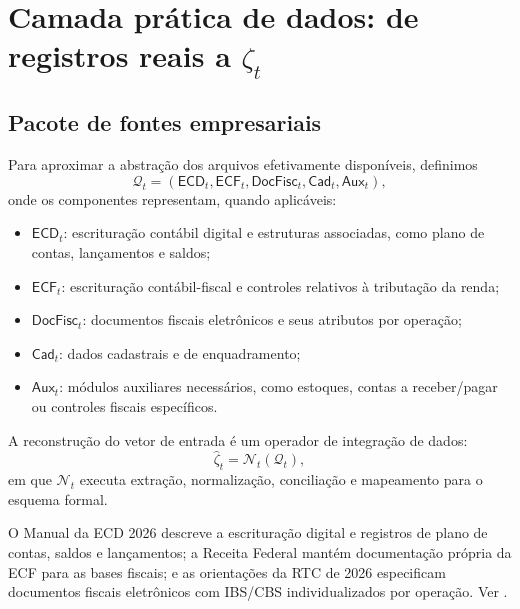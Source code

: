 \documentclass[11pt,a4paper]{article}
\newcommand{\cQ}{\mathcal{Q}}
\newcommand{\cN}{\mathcal{N}}
\begin{document}
\section{Camada prática de dados: de registros reais a $\zeta_t$}

\subsection{Pacote de fontes empresariais}

Para aproximar a abstração dos arquivos efetivamente disponíveis, definimos
\begin{equation}
\boxed{
\cQ_t=
(\mathsf{ECD}_t,\mathsf{ECF}_t,\mathsf{DocFisc}_t,\mathsf{Cad}_t,\mathsf{Aux}_t),
}
\label{eq:qdata}
\end{equation}
onde os componentes representam, quando aplicáveis:
\begin{itemize}
  \item $\mathsf{ECD}_t$: escrituração contábil digital e estruturas associadas, como plano de contas, lançamentos e saldos;
  \item $\mathsf{ECF}_t$: escrituração contábil-fiscal e controles relativos à tributação da renda;
  \item $\mathsf{DocFisc}_t$: documentos fiscais eletrônicos e seus atributos por operação;
  \item $\mathsf{Cad}_t$: dados cadastrais e de enquadramento;
  \item $\mathsf{Aux}_t$: módulos auxiliares necessários, como estoques, contas a receber/pagar ou controles fiscais específicos.
\end{itemize}

A reconstrução do vetor de entrada é um operador de integração de dados:
\begin{equation}
\boxed{
\widehat\zeta_t=\cN_t(\cQ_t),
}
\label{eq:normalize}
\end{equation}
em que $\cN_t$ executa extração, normalização, conciliação e mapeamento para o esquema formal.

\begin{fonte}
O Manual da ECD 2026 descreve a escrituração digital e registros de plano de contas, saldos e lançamentos; a Receita Federal mantém documentação própria da ECF para as bases fiscais; e as orientações da RTC de 2026 especificam documentos fiscais eletrônicos com IBS/CBS individualizados por operação. Ver \cite{ECD2026,RFB_ECF_2026,RFB_ORIENT_2026}.
\end{fonte}
\end{document}
